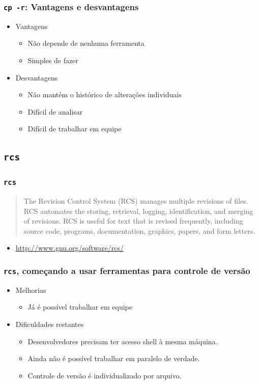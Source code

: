 \documentclass{beamer}
\newcommand{\cpr}{\texttt{cp -r}}
\newcommand{\rcs}{\texttt{rcs}}
\begin{document}
\begin{frame}
  \frametitle{\cpr: Vantagens e desvantagens}
  \begin{itemize}
    \item Vantagens
      \begin{itemize}
        \item Não depende de nenhuma ferramenta
        \item Simples de fazer
      \end{itemize}
    \item Desvantagens
      \begin{itemize}
        \item Não mantém o histórico de alterações individuais
        \item Difícil de analisar
        \item Difícil de trabalhar em equipe
      \end{itemize}
  \end{itemize}
\end{frame}

\subsection{\rcs}

\begin{frame}
  \frametitle{\rcs}
  \begin{quote}
    The Revision Control System (RCS) manages multiple revisions of
    files. RCS automates the storing, retrieval, logging,
    identification, and merging of revisions. RCS is useful for text
    that is revised frequently, including source code, programs,
    documentation, graphics, papers, and form letters.
  \end{quote}

  \begin{itemize}
    \item \url{http://www.gnu.org/software/rcs/}
  \end{itemize}
\end{frame}

\begin{frame}
  \frametitle{\rcs, começando a usar ferramentas para controle de versão}
  \begin{itemize}
    \item Melhorias
      \begin{itemize}
        \item Já é possível trabalhar em equipe
      \end{itemize}

    \item Dificuldades restantes
      \begin{itemize}
        \item Desenvolvedores precisam ter acesso shell à mesma máquina.
        \item Ainda não é possível trabalhar em paralelo de verdade.
        \item Controle de versão é individualizado por arquivo.
      \end{itemize}
  \end{itemize}
\end{frame}
\end{document}
